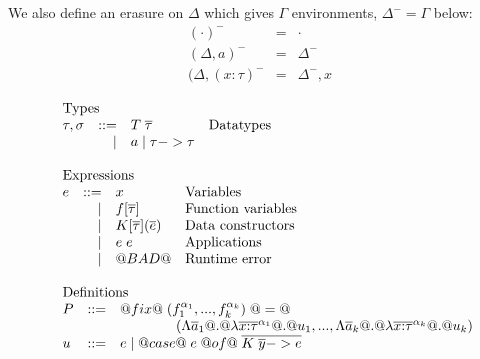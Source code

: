 \documentclass[preprint,nocopyrightspace,draft]{sigplanconf}
\begin{document}
We also define an erasure on $\Delta$ which gives $\Gamma$ environments, $\Delta^{-} = \Gamma$ below:
\[\begin{array}{lrll}
(\cdot)^{-}            & = & \cdot \\
(\Delta,a)^{-}         & = & \Delta^{-} \\
(\Delta,(x{:}\tau)^{-} & = & \Delta^{-},x 
\end{array}\]

\newcommand{\ar}{\alpha}

\begin{figure}\small
\[\begin{array}{l} 
\begin{array}{lrll}
\multicolumn{3}{l}{\text{Types}} \\
\tau,\sigma & ::=  & T\;\taus & \text{Datatypes} \\ 
            & \mid & a \mid \tau -> \tau 
\end{array}\\ \\ 
\begin{array}{lrll}
\multicolumn{3}{l}{\text{Expressions}} \\
e  & ::=  & x            & \text{Variables} \\ 
   & \mid & f[\ol{\tau}] & \text{Function variables} \\ 
   & \mid & K[\ol{\tau}](\ol{e}) & \text{Data constructors} \\
   & \mid & e\;e         & \text{Applications} \\
   & \mid & @BAD@        & \text{Runtime error} \\ 
\end{array}\\ \\ 
\begin{array}{lrll}
\multicolumn{3}{l}{\text{Definitions}} \\
P   & ::= & @fix@\;(f_1^{\ar_1},...,f_k^{\ar_k})\;@=@ \\ 
    &     & \quad\quad\quad\quad (\Lambda\as_1 @.@ \lambda{\oln{x{:}\tau}{\ar_1}} @.@ u_1,...,
                                                \Lambda\as_k @.@ \lambda{\oln{x{:}\tau}{\ar_k}} @.@ u_k) \\
u   & ::= & e \mid @case@\;e\;@of@\;\ol{K\;\ol{y} -> e} \\ 
\end{array}\\ \\ 

\end{array}\]
\end{figure}
\end{document}
